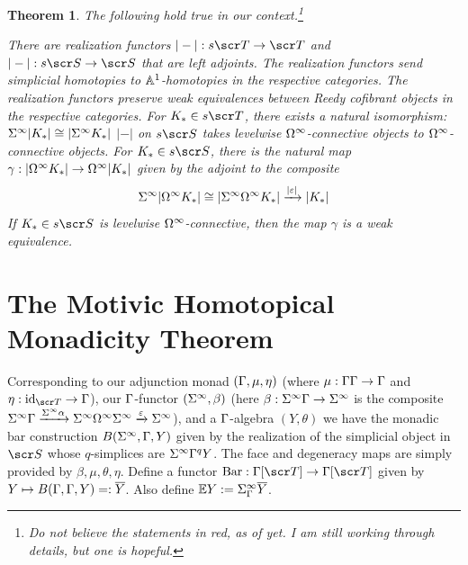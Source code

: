 \documentclass{amsart}
\newtheorem{thm}{Theorem}[section]
\theoremstyle{definition}
\begin{document}
\begin{thm}
The following hold true in our context.\footnote{Do not believe the statements in red, as of yet. I am still working through details, but one is hopeful.}
\begin{outline}[enumerate]
\1 There are realization functors $|-| : s\sT \to \sT$ and $|-| : s\sS \to \sS$ that are left adjoints.
\1 The realization functors send simplicial homotopies to $\mathbb{A}^1$-homotopies in the respective categories.
\1 The realization functors preserve weak equivalences between Reedy cofibrant objects in the respective categories.%
\1 For $K_{*} \in s\sT$, there exists a natural isomorphism:
$\Sigma^{\infty} |K_{*}| \cong |\Sigma^{\infty}K_{*}|$
\1 $|-|$ on $s\sS$ takes levelwise $\Omega^{\infty}$-connective objects to $\Omega^{\infty}$-connective objects.
\1 For $K_{*} \in s\sS$, there is the natural map $\gamma:|\Omega^{\infty}K_{*}| \to \Omega^{\infty}|K_{*}|$ given by the adjoint to the composite \[\Sigma^{\infty} |\Omega^{\infty}K_{*}| \cong |\Sigma^{\infty}\Omega^{\infty}K_{*}| \xrightarrow{|\varepsilon|} |K_{*}| \]
\noindent If $K_{*} \in s\sS$ is levelwise $\Omega^{\infty}$-connective, then the map $\gamma$ is a weak equivalence.
\end{outline}
\end{thm}

\section{The Motivic Homotopical Monadicity Theorem}\label{sec:recprinc}
Corresponding to our adjunction monad $(\Gamma,\mu,\eta)$ (where $\mu : \Gamma \Gamma \to \Gamma$ and $\eta : \mathrm{id}_{\sT} \to \GA$), our $\Gamma$-functor $(\Sigma^{\infty},\beta)$ (here $\beta:\Sigma^{\infty}\Gamma \to \Sigma^{\infty}$ is the composite $\Sigma^{\infty}\Gamma \xrightarrow{\Sigma^{\infty}\alpha} \Sigma^{\infty}\Omega^{\infty}\Sigma^{\infty} \xrightarrow{\varepsilon} \Sigma^{\infty}$), and a $\Gamma$-algebra $(Y,\theta)$ we have the monadic bar construction $B(\Sigma^{\infty},\Gamma,Y)$ given by the realization of the simplicial object in $\sS$ whose $q$-simplices are $\Sigma^{\infty}\Gamma^qY$. The face and degeneracy maps are simply provided by $\beta, \mu, \theta, \eta$. Define a functor $\mathrm{Bar} : \GA[\sT] \to \GA[\sT]$ given by $Y \mapsto B(\Gamma,\Gamma,Y) =: \overline{Y}$. Also define $\mathbb{E} Y := \Sigma^{\infty}_{\Gamma}\overline{Y}$.
\end{document}
